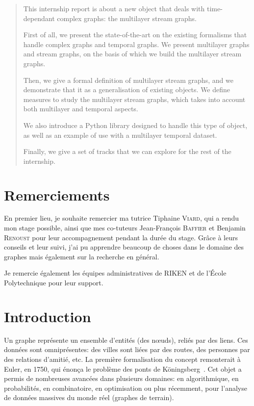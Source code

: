 \documentclass[11pt,a4paper]{article}
\theoremstyle{definition}
\theoremstyle{remark}
\theoremstyle{remark}
\begin{document}
\begin{abstract}

This internship report is about a new object that deals with time-dependant complex graphs: the multilayer stream graphs. 

First of all, we present the state-of-the-art on the existing formalisms that handle complex graphs and temporal graphs. We present multilayer graphs and stream graphs, on the basis of which we build the multilayer stream graphs.

Then, we give a formal definition of multilayer stream graphs, and we demonstrate that it as a generalisation of existing objects. We define measures to study the multilayer stream graphs, which takes into account both multilayer and temporal aspects.

We also introduce a Python library designed to handle this type of object, as well as an example of use with a multilayer temporal dataset.

Finally, we give a set of tracks that we can explore for the rest of the internship.

\end{abstract}

\newpage 

\tableofcontents
\newpage


\section*{Remerciements}

    En premier lieu, je souhaite remercier ma tutrice Tiphaine \textsc{Viard}, qui a rendu mon stage possible, ainsi que mes co-tuteurs Jean-François \textsc{Baffier} et Benjamin \textsc{Renoust} pour leur accompagnement pendant la durée du stage. Grâce à leurs conseils et leur suivi, j'ai pu apprendre beaucoup de choses dans le domaine des graphes mais également sur la recherche en général.
    
    Je remercie également les équipes administratives de RIKEN et de l'École Polytechnique pour leur support.

\newpage

\section*{Introduction}

    Un graphe représente un ensemble d'entités (des n\oe{}uds), reliés par des liens. Ces données sont omniprésentes: des villes sont liées par des routes, des personnes par des relations d'amitié, etc. La première formalisation du concept remonterait à Euler, en 1750, qui énonça le problème des ponts de Köningsberg~\cite{wikigraphes,divin}. Cet objet a permis de nombreuses avancées dans plusieurs domaines: en algorithmique, en probabilités, en combinatoire, en optimisation ou plus récemment, pour l'analyse de données massives du monde réel (graphes de terrain).
    
\end{document}
